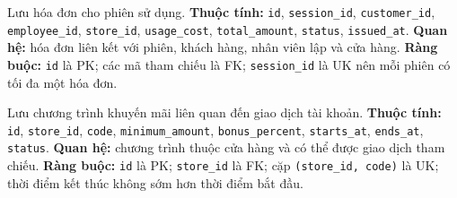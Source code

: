 \begin{description}[leftmargin=3.7cm,labelwidth=3.5cm,style=nextline]
  \item[\texttt{invoices}] Lưu hóa đơn cho phiên sử dụng. \textbf{Thuộc tính:} \texttt{id}, \texttt{session\_id}, \texttt{customer\_id}, \texttt{employee\_id}, \texttt{store\_id}, \texttt{usage\_cost}, \texttt{total\_amount}, \texttt{status}, \texttt{issued\_at}. \textbf{Quan hệ:} hóa đơn liên kết với phiên, khách hàng, nhân viên lập và cửa hàng. \textbf{Ràng buộc:} \texttt{id} là PK; các mã tham chiếu là FK; \texttt{session\_id} là UK nên mỗi phiên có tối đa một hóa đơn.
  \item[\texttt{promotions}] Lưu chương trình khuyến mãi liên quan đến giao dịch tài khoản. \textbf{Thuộc tính:} \texttt{id}, \texttt{store\_id}, \texttt{code}, \texttt{minimum\_amount}, \texttt{bonus\_percent}, \texttt{starts\_at}, \texttt{ends\_at}, \texttt{status}. \textbf{Quan hệ:} chương trình thuộc cửa hàng và có thể được giao dịch tham chiếu. \textbf{Ràng buộc:} \texttt{id} là PK; \texttt{store\_id} là FK; cặp \texttt{(store\_id, code)} là UK; thời điểm kết thúc không sớm hơn thời điểm bắt đầu.
\end{description}

